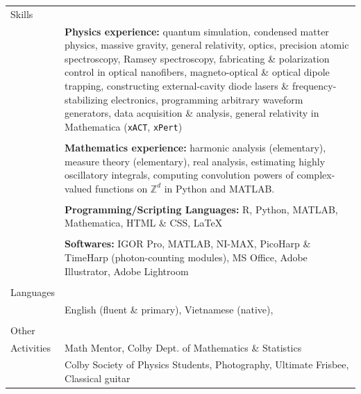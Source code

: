\documentclass[10pt]{article}
\begin{document}
\begin{longtable}{ l p{14.7cm}   }
     					 
     					 
  
     				 	 
  
  
  						 
  						 
  \large{Skills}      	& \\ 
  						& \textbf{Physics experience:} quantum simulation, condensed matter physics, massive gravity,  general relativity, optics, precision atomic spectroscopy, Ramsey spectroscopy, fabricating \& polarization control in optical nanofibers, magneto-optical \& optical dipole trapping, constructing external-cavity diode lasers \& frequency-stabilizing electronics, programming arbitrary waveform generators, data acquisition \& analysis, general relativity in Mathematica (\texttt{xACT}, \texttt{xPert})  \\ 
  						& \\
  						& \textbf{Mathematics experience:} harmonic analysis (elementary), measure theory (elementary), real analysis, estimating highly oscillatory integrals, computing convolution powers of complex-valued functions on $\mathbb{Z}^d$ in Python and MATLAB.\\
  						& \\
  						& \textbf{Programming/Scripting Languages:} R, Python, MATLAB, Mathematica, HTML \& CSS, \LaTeX{}\\
  						& \\
  						& \textbf{Softwares:} IGOR Pro, MATLAB, NI-MAX, PicoHarp \& TimeHarp (photon-counting modules), MS Office,  Adobe Illustrator, Adobe Lightroom\\ 
  						& \\
  						 
  				

  \large{Languages}     & \\
  						& English (fluent \& primary), Vietnamese (native), \\
						& \\
  						 
  \large{Other}         & \\ 
  \large{Activities}	& Math Mentor, Colby Dept. of Mathematics \& Statistics \\
  						& Colby Society of Physics Students, Photography, Ultimate Frisbee, Classical guitar \\
  						
  						
  						


     		


\end{longtable}
\end{document}
